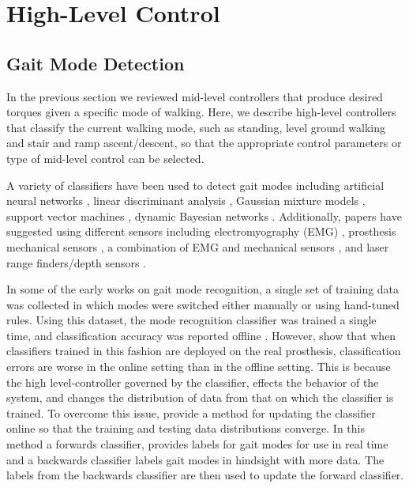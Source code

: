 \section{High-Level Control}\label{sec:back_high_level_control}

\subsection{Gait Mode Detection}
In the previous section we reviewed mid-level controllers that produce desired
torques given a specific mode of walking. Here, we describe high-level
controllers that classify the current walking mode, such as standing, level
ground walking and stair and ramp ascent/descent, so that the appropriate
control parameters or type of mid-level control can be selected. 

A variety of classifiers have been used to detect gait modes including
artificial neural networks \citep{huang2009strategy}, linear discriminant
analysis
\citep{huang2009strategy,huang2011continuous,hargrove2015intuitive,young2014intent},
Gaussian mixture models \citep{varol2010multiclass}, support vector machines
\citep{huang2011continuous,massalin2017user,yan2018locomotion}, dynamic Bayesian
networks \citep{young2014intent,hargrove2015intuitive,spanias2018online}.
Additionally, papers have suggested using different sensors including
electromyography (EMG) \citep{huang2009strategy}, prosthesis mechanical sensors
\citep{varol2010multiclass,young2014intent,young2014training}, a combination of
EMG and mechanical sensors
\citep{huang2011continuous,spanias2018online,hargrove2015intuitive}, and laser
range finders/depth sensors
\citep{zhang2011preliminary,liu2016development,massalin2017user,yan2018locomotion}.

In some of the early works on gait mode recognition, a single set of training
data was collected in which modes were switched either manually or using
hand-tuned rules. Using this dataset, the mode recognition classifier was
trained a single time, and classification accuracy was reported offline
\citep{huang2009strategy,huang2011continuous,young2014intent}. However,
\citet{hargrove2015intuitive} show that when classifiers trained in this fashion
are deployed on the real prosthesis, classification errors are worse in the
online setting than in the offline setting. This is because the high
level-controller governed by the classifier, effects the behavior of the system,
and changes the distribution of data from that on which the classifier is
trained. To overcome this issue, \citet{spanias2018online} provide a method for
updating the classifier online so that the training and testing data
distributions converge. In this method a forwards classifier, provides labels
for gait modes for use in real time and a backwards classifier labels gait modes
in hindsight with more data. The labels from the backwards classifier are then
used to update the forward classifier. 
